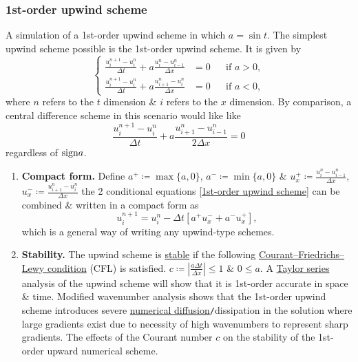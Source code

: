 \documentclass{article}
\begin{document}
\subsubsection{1st-order upwind scheme}
{\sf A simulation of a 1st-order upwind scheme in which $a = \sin t$.} The simplest upwind scheme possible is the 1st-order upwind scheme. It is given by
\begin{equation}
	\label{1st-order upwind scheme}
	\left\{\begin{split}
		\frac{u_i^{n+1} - u_i^n}{\Delta t} + a\frac{u_i^n - u_{i-1}^n}{\Delta x} &= 0&&\mbox{if } a > 0,\\
		\frac{u_i^{n+1} - u_i^n}{\Delta t} + a\frac{u_{i+1}^n - u_i^n}{\Delta x} &= 0&&\mbox{if } a < 0,
	\end{split}\right.
\end{equation}
where $n$ refers to the $t$ dimension \& $i$ refers to the $x$ dimension. By comparison, a central difference scheme in this scenario would like like
\begin{equation}
	\frac{u_i^{n+1} - u_i^n}{\Delta t} + a\frac{u_{i+1}^n - u_{i-1}^n}{2\Delta x} = 0
\end{equation}
regardless of ${\rm sign}a$.
\begin{enumerate}
	\item {\bf Compact form.} Define $a^+\coloneqq\max\{a,0\}$, $a^-\coloneqq\min\{a,0\}$ \& $u_x^+\coloneqq\frac{u_i^n - u_{i-1}^n}{\Delta x}$, $u_x^-\coloneqq\frac{u_{i+1}^n - u_i^n}{\Delta x}$ the 2 conditional equations \eqref{1st-order upwind scheme} can be combined \& written in a compact form as
	\begin{equation}
		\label{1st-order upwind scheme: compact form}
		u_i^{n+1} = u_i^n - \Delta t[a^+u_x^- + a^-u_x^+],
	\end{equation}
	which is a general way of writing any upwind-type schemes.
	\item {\bf Stability.} The upwind scheme is \href{https://en.wikipedia.org/wiki/Numerical_stability}{stable} if the following \href{https://en.wikipedia.org/wiki/Courant%E2%80%93Friedrichs%E2%80%93Lewy_condition}{Courant--Friedrichs--Lewy condition} (CFL) is satisfied. $c\coloneqq\left|\frac{a\Delta t}{\Delta x}\right|\le1$ \& $0\le a$. A \href{https://en.wikipedia.org/wiki/Taylor_series}{Taylor series} analysis of the upwind scheme will show that it is 1st-order accurate in space \& time. Modified wavenumber analysis shows that the 1st-order upwind scheme introduces severe \href{https://en.wikipedia.org/wiki/Numerical_diffusion}{numerical diffusion}{\tt/}dissipation in the solution where large gradients exist due to necessity of high wavenumbers to represent sharp gradients. {\sf The effects of the Courant number $c$ on the stability of the 1st-order upward numerical scheme.}
\end{enumerate}
\end{document}
